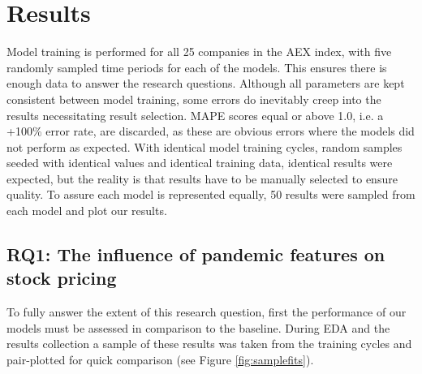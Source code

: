 \section{Results}
\label{sec:res}





Model training is performed for all 25 companies in the AEX index, with five randomly sampled time periods for each of the models. This ensures there is enough data to answer the research questions. Although all parameters are kept consistent between model training, some errors do inevitably creep into the results necessitating result selection. MAPE scores equal or above 1.0, i.e. a +100\% error rate, are discarded, as these are obvious errors where the models did not perform as expected. With identical model training cycles, random samples seeded with identical values and identical training data, identical results were expected, but the reality is that results have to be manually selected to ensure quality. To assure each model is represented equally, 50 results were sampled from each model and plot our results.

\subsection{RQ1: The influence of pandemic features on stock pricing}

To fully answer the extent of this research question, first the performance of our models must be assessed in comparison to the baseline. During EDA and the results collection a sample of these results was taken from the training cycles and pair-plotted for quick comparison (see Figure \ref{fig:samplefits}).

